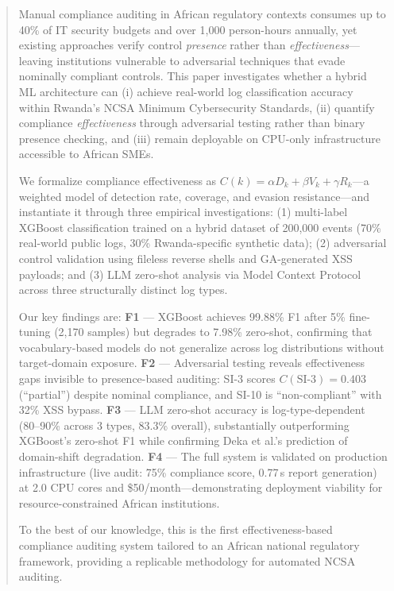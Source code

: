 \documentclass[11pt,conference]{IEEEtran}
\begin{document}
\begin{abstract}
Manual compliance auditing in African regulatory contexts consumes up to 40\% of IT security budgets and over 1,000 person-hours annually, yet existing approaches verify control \textit{presence} rather than \textit{effectiveness}---leaving institutions vulnerable to adversarial techniques that evade nominally compliant controls. This paper investigates whether a hybrid ML architecture can (i) achieve real-world log classification accuracy within Rwanda's NCSA Minimum Cybersecurity Standards, (ii) quantify compliance \textit{effectiveness} through adversarial testing rather than binary presence checking, and (iii) remain deployable on CPU-only infrastructure accessible to African SMEs.

We formalize compliance effectiveness as $C(k) = \alpha D_k + \beta V_k + \gamma R_k$---a weighted model of detection rate, coverage, and evasion resistance---and instantiate it through three empirical investigations: (1) multi-label XGBoost classification trained on a hybrid dataset of 200,000 events (70\% real-world public logs, 30\% Rwanda-specific synthetic data); (2) adversarial control validation using fileless reverse shells and GA-generated XSS payloads; and (3) LLM zero-shot analysis via Model Context Protocol across three structurally distinct log types.

Our key findings are: \textbf{F1} --- XGBoost achieves 99.88\% F1 after 5\% fine-tuning (2,170 samples) but degrades to 7.98\% zero-shot, confirming that vocabulary-based models do not generalize across log distributions without target-domain exposure. \textbf{F2} --- Adversarial testing reveals effectiveness gaps invisible to presence-based auditing: SI-3 scores $C(\text{SI-3}) = 0.403$ (``partial'') despite nominal compliance, and SI-10 is ``non-compliant'' with 32\% XSS bypass. \textbf{F3} --- LLM zero-shot accuracy is log-type-dependent (80--90\% across 3 types, 83.3\% overall), substantially outperforming XGBoost's zero-shot F1 while confirming Deka et al.'s prediction of domain-shift degradation. \textbf{F4} --- The full system is validated on production infrastructure (live audit: 75\% compliance score, 0.77\,s report generation) at 2.0 CPU cores and \$50/month---demonstrating deployment viability for resource-constrained African institutions.

To the best of our knowledge, this is the first effectiveness-based compliance auditing system tailored to an African national regulatory framework, providing a replicable methodology for automated NCSA auditing.
\end{abstract}
\end{document}
